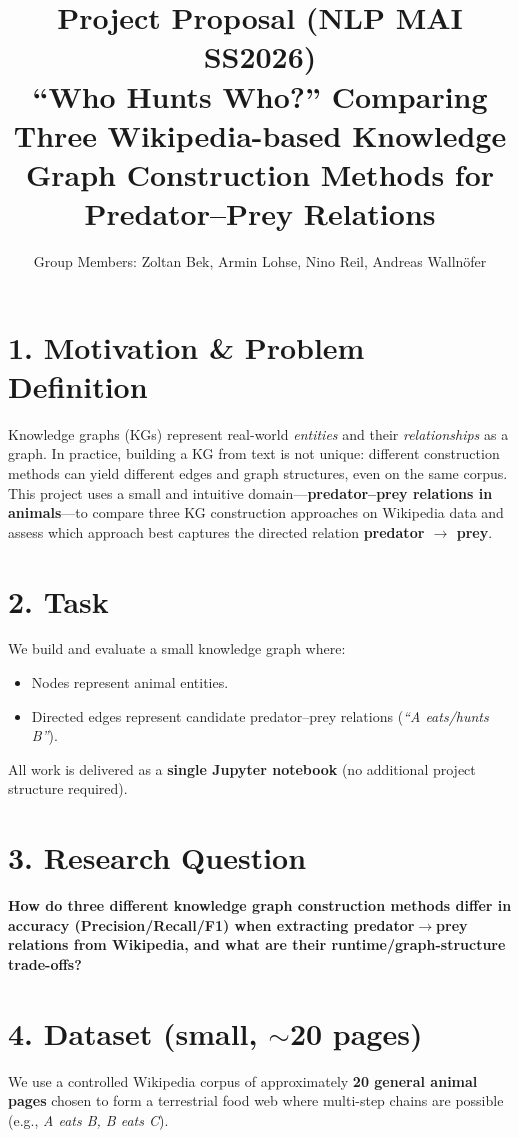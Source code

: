 \documentclass[11pt,a4paper]{article}
\title{\vspace{-1.0cm}
\textbf{Project Proposal (NLP MAI SS2026)}\\
\vspace{0.2cm}
\textbf{``Who Hunts Who?'' Comparing Three Wikipedia-based Knowledge Graph Construction Methods for Predator--Prey Relations}
\vspace{-0.2cm}}
\author{Group Members: \; Zoltan Bek,  Armin Lohse, Nino Reil, Andreas Wallnöfer}
\begin{document}
\maketitle
\vspace{-0.4cm}

\section*{1. Motivation \& Problem Definition}
Knowledge graphs (KGs) represent real-world \textit{entities} and their \textit{relationships} as a graph. In practice, building a KG from text is not unique: different construction methods can yield different edges and graph structures, even on the same corpus. This project uses a small and intuitive domain---\textbf{predator--prey relations in animals}---to compare three KG construction approaches on Wikipedia data and assess which approach best captures the directed relation \textbf{predator $\rightarrow$ prey}.

\section*{2. Task}
We build and evaluate a small knowledge graph where:
\begin{itemize}[leftmargin=*,nosep]
  \item Nodes represent animal entities.
  \item Directed edges represent candidate predator--prey relations (\textit{``A eats/hunts B''}).
\end{itemize}
All work is delivered as a \textbf{single Jupyter notebook} (no additional project structure required).

\section*{3. Research Question}
\textbf{How do three different knowledge graph construction methods differ in accuracy (Precision/Recall/F1) when extracting predator$\rightarrow$prey relations from Wikipedia, and what are their runtime/graph-structure trade-offs?}

\section*{4. Dataset (small, $\sim$20 pages)}
We use a controlled Wikipedia corpus of approximately \textbf{20 general animal pages} chosen to form a terrestrial food web where multi-step chains are possible (e.g., \textit{A eats B, B eats C}).
\end{document}
